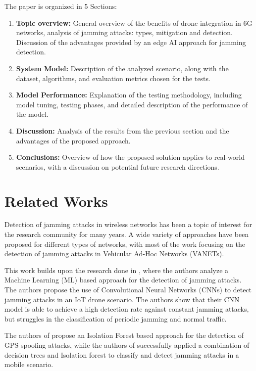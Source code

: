 \documentclass[futureinternet,article,submit,pdftex,moreauthors]{Definitions/mdpi}
\begin{document}
The paper is organized in 5 Sections: 
\begin{enumerate}
	\item \textbf{Topic overview:} General overview of the benefits of drone integration in 6G networks, analysis of jamming attacks: types, mitigation and detection. Discussion of the advantages provided by an edge AI approach for jamming detection. 
	\item \textbf{System Model:} Description of the analyzed scenario, along with the dataset, algorithms, and evaluation metrics chosen for the tests.
	\item \textbf{Model Performance:} Explanation of the testing methodology, including model tuning, testing phases, and detailed description of the performance of the model.
	\item \textbf{Discussion:} Analysis of the results from the previous section and the advantages of the proposed approach.
	\item \textbf{Conclusions:} Overview of how the proposed solution applies to real-world scenarios, with a discussion on potential future research directions.
\end{enumerate}

\section{Related Works}

Detection of jamming attacks in wireless networks has been a topic of interest for the research community for many years. A wide variety of approaches have been proposed for different types of networks, with most of the work focusing on the detection of jamming attacks in Vehicular Ad-Hoc Networks (VANETs)\cite{VANETsAI-Lyamin}.

This work builds upon the research done in \cite{JammingDetectionIoT-Hussain}, where the authors analyze a Machine Learning (ML) based approach for the detection of jamming attacks. 
The authors propose the use of Convolutional Neural Networks (CNNs) to detect jamming attacks in an IoT drone scenario. The authors \cite{JammingDetectionIoT-Hussain} show that their CNN model is able to achieve a high detection rate against constant jamming attacks, but
struggles in the classification of periodic jamming and normal traffic. 

The authors of \cite{GPSSpoofingDetection-Zuo} propose an Isolation Forest based approach for the detection of GPS spoofing attacks, while the authors of \cite{HybridJammingDetection-Hong} successfully applied a combination of decision trees and Isolation forest to classify 
and detect jamming attacks in a mobile scenario. 
\end{document}
